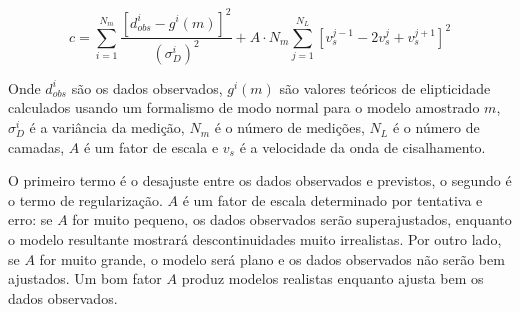 \documentclass[smallextended]{svjour3}       %
\begin{document}
\begin{equation}\label{eq:cost_function}
  c = \sum_{i=1}^{N_m} \frac{[d_{obs}^i - g^i(m)]^2}{(\sigma^i_{D})^2} + A \cdot N_m \sum_{j=1}^{N_L} [v_s^{j - 1} - 2v_s^{j} + v_s^{j + 1}]^2 
\end{equation}

Onde $d_{obs}^i$ são os dados observados, $g^i(m)$ são valores teóricos de elipticidade calculados usando um formalismo de modo normal para o modelo amostrado $m$, $\sigma^i_{D}$ é a variância da medição, $N_m$ é o número de medições, $N_L$ é o número de camadas, $A$ é um fator de escala e $v_s$ é a velocidade da onda de cisalhamento. 

O primeiro termo é o desajuste entre os dados observados e previstos, o segundo é o termo de regularização. $A$ é um fator de escala determinado por tentativa e erro: se $A$ for muito pequeno, os dados observados serão superajustados, enquanto o modelo resultante mostrará descontinuidades muito irrealistas. Por outro lado, se $A$ for muito grande, o modelo será plano e os dados observados não serão bem ajustados. Um bom fator $A$ produz modelos realistas enquanto ajusta bem os dados observados. 







\end{document}
